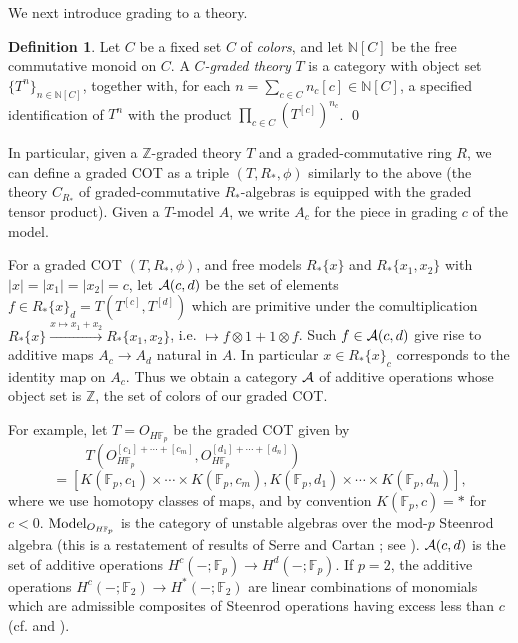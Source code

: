 \documentclass{gtpart}
\theoremstyle{definition}
\newtheorem{defn}[thm]{Definition}
\theoremstyle{remark}
\newcommand{\mb}[1]{\mathbb{#1}}
\newcommand{\Model}{{\rm Model}}
\newcommand{\cff}[2]{cf.\thinspace{\cite[#1]{#2}}}
\begin{document}
We next introduce grading to a theory.  
\begin{defn}
 Let $C$ be a fixed set $C$ of {\em colors}, and let ${\mb N}[C]$ be the free 
 commutative monoid on $C$.  A {\em $C$-graded theory} $T$ is a category with 
 object set $\{T^n\}_{n \in {\mb N}[C]}$, together with, for each 
 $n = \sum_{c \in C} n_c[c] \in {\mb N}[C]$, a specified identification of 
 $T^n$ with the product $\prod_{c \in C} (T^{[c]})^{n_c}$.  \qed
\end{defn}
In particular, given a $\mb Z$-graded theory $T$ and a graded-commutative ring 
$R$, we can define a graded COT as a triple $(T,R_*,\phi)$ similarly to the 
above (the theory $C_{R_*}$ of graded-commutative $R_*$-algebras is equipped 
with the graded tensor product).  Given a $T$-model $A$, we write $A_c$ for 
the piece in grading $c$ of the model.  

For a graded COT $(T,R_*,\phi)$, and free models $R_*\{x\}$ and 
$R_*\{x_1,x_2\}$ with $|x| = |x_1| = |x_2| = c$, let ${\cal A}(c,d)$ be the 
set of elements $f \in R_*\{x\}_d = T(T^{[c]},T^{[d]})$ which are primitive 
under the comultiplication $R_*\{x\} \xrightarrow{x \mapsto x_1 + x_2} 
R_*\{x_1,x_2\}$, i.e. $\mapsto f \otimes 1 + 1 \otimes f$.  
Such $f \in {\cal A}(c,d)$ give rise to additive maps $A_c \to A_d$ natural in 
$A$.  In particular $x \in R_*\{x\}_c$ corresponds to the identity map on 
$A_c$.  Thus we obtain a category $\cal A$ of additive operations whose object 
set is $\mb Z$, the set of colors of our graded COT.  

For example, let $T = O_{H{\mb F}_p}$ be the graded COT given by 
\[
 T(O_{H{\mb F}_p}^{[c_1]+\cdots+[c_m]}, O_{H{\mb F}_p}^{[d_1]+\cdots+[d_n]}) 
 ~~~~~~~~~~~~~~~~~~~~~~~~~~~~~~~~~~~~~~~~~~~
\]
\[
 = [K({\mb F}_p,c_1) \times \cdots \times K({\mb F}_p,c_m), 
 K({\mb F}_p,d_1) \times \cdots \times K({\mb F}_p,d_n)], 
\]
where we use homotopy classes of maps, and by convention $K({\mb F}_p,c) = *$ 
for $c<0$.  $\Model_{O_{H{\mb F}_p}}$ is the category of unstable algebras 
over the mod-$p$ Steenrod algebra (this is a restatement of results of Serre 
\cite{serre} and Cartan \cite{cartan}; see \cite[II.\S5]{steenrod}).  
${\cal A}(c,d)$ is the set of additive operations 
$H^c(-;{\mb F}_p) \to H^d(-;{\mb F}_p)$.  If $p=2$, the additive operations 
$H^c(-;{\mb F}_2) \to H^*(-;{\mb F}_2)$ are linear combinations of monomials 
which are admissible composites of Steenrod operations having excess less than 
$c$ (\cff{theorem 2 of \S4}{serre} and 
\cite[chapters 3 and 9]{moshertangora}).  
\end{document}
